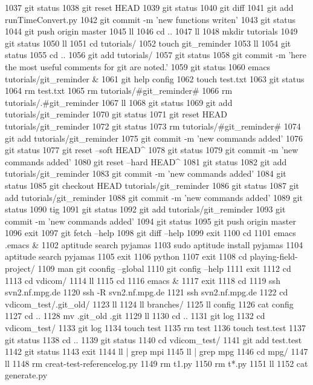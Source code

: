  1037  git status
 1038  git reset HEAD
 1039  git status
 1040  git diff
 1041  git add runTimeConvert.py
 1042  git commit -m 'new functions writen'
 1043  git status
 1044  git push origin master
 1045  ll
 1046  cd ..
 1047  ll
 1048  mkdir tutorials
 1049  git status
 1050  ll
 1051  cd tutorials/
 1052  touch git_reminder
 1053  ll
 1054  git status
 1055  cd ..
 1056  git add tutorials/
 1057  git status
 1058  git commit -m 'here the most useful comments for git are noted.'
 1059  git status
 1060  emacs tutorials/git_reminder &
 1061  git help config
 1062  touch test.txt
 1063  git status
 1064  rm test.txt 
 1065  rm tutorials/#git_reminder# 
 1066  rm tutorials/.#git_reminder 
 1067  ll
 1068  git status
 1069  git add tutorials/git_reminder
 1070  git status
 1071  git reset HEAD tutorials/git_reminder
 1072  git status
 1073  rm tutorials/#git_reminder# 
 1074  git add tutorials/git_reminder
 1075  git commit -m 'new commands added'
 1076  git status
 1077  git reset --soft HEAD^
 1078  git status
 1079  git commit -m 'new commands added'
 1080  git reset --hard HEAD^
 1081  git status
 1082  git add tutorials/git_reminder
 1083  git commit -m 'new commands added'
 1084  git status
 1085  git checkout HEAD tutorials/git_reminder
 1086  git status
 1087  git add tutorials/git_reminder
 1088  git commit -m 'new commands added'
 1089  git status
 1090  tig
 1091  git status
 1092  git add tutorials/git_reminder
 1093  git commit -m 'new commands added'
 1094  git status
 1095  git push origin master
 1096  exit
 1097  git fetch --help
 1098  git diff --help
 1099  exit
 1100  cd
 1101  emacs .emacs &
 1102  aptitude search pyjamas
 1103  sudo aptitude install pyjamas
 1104  aptitude search pyjamas
 1105  exit
 1106  python
 1107  exit
 1108  cd playing-field-project/
 1109  man git coonfig --global 
 1110  git config --help
 1111  exit
 1112  cd
 1113  cd vdicom/
 1114  ll
 1115  cd
 1116  emacs &
 1117  exit
 1118  cd
 1119  ssh svn2.nf.mpg.de
 1120  ssh -R svn2.nf.mpg.de
 1121  ssh svn2.nf.mpg.de
 1122  cd vdicom_test/.git_old/
 1123  ll
 1124  ll branches/
 1125  ll config 
 1126  cat config 
 1127  cd ..
 1128  mv .git_old .git
 1129  ll
 1130  cd ..
 1131  git log
 1132  cd vdicom_test/
 1133  git log
 1134  touch test
 1135  rm test 
 1136  touch test.test
 1137  git status
 1138  cd ..
 1139  git status
 1140  cd vdicom_test/
 1141  git add test.test
 1142  git status
 1143  exit
 1144  ll | grep mpi
 1145  ll | grep mpg
 1146  cd mpg/
 1147  ll
 1148  rm creat-test-referencelog.py 
 1149  rm t1.py 
 1150  rm t*.py
 1151  ll
 1152  cat generate.py 

